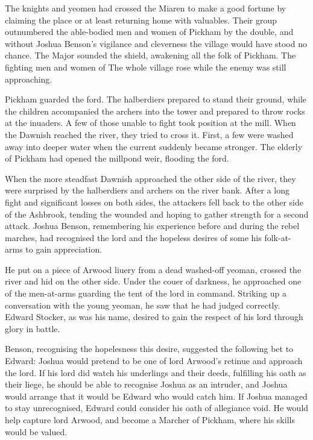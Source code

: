 \documentclass[twoside,11pt,b5paper,twocolumn]{scrbook}
\begin{document}
The knights and
yeomen had crossed the Miaren to
make a good fortune by claiming the
place or at least returning home
with valuables. Their group
outnumbered the able-bodied men
and women of Pickham by the
double, and without Joshua
Benson's vigilance and cleverness
the village would have stood no
chance. The Major sounded the shield,
awakening all the folk of Pickham.
The fighting men and women of 
The whole village rose while
the enemy was still approaching.

Pickham guarded the ford. The
halberdiers prepared to stand their 
ground, while the children
accompanied the archers into the
tower and prepared to throw rocks 
at the inuaders. A few of those
unable to fight took position at the
mill. When the Dawnish
reached the river, they tried to cross
it. First, a few were washed away 
into deeper water when the current 
suddenly became stronger. The
elderly of Pickham had opened the
millpond weir, flooding the ford.

When the more steadfast Dawnish
approached the other side of the river,
they were surprised by the
halberdiers and archers on the river
bank. After a long fight and
significant losses on both sides, the
attackers fell back to the other side of
 the Ashbrook, tending the wounded
and hoping to gather strength for a
 second attack. Joshua Benson,
remembering his experience before
and during the rebel marches, had
recognised the lord and the hopeless
desires of some his
folk-at-arms to gain
appreciation.

He
put on a piece of
Arwood liuery from a
dead washed-off
yeoman, crossed the
river and hid on the
other side. Under the
couer of darkness, he
approached one of the
men-at-arms guarding the tent of
the lord in command. Striking up a
conversation with the young
yeoman, he saw that he had judged
correctly. Edward Stocker, as was
his name, desired to gain the respect
of his lord through glory in battle.

Benson, recognising the hopelesness
this desire, suggested the following
bet to Edward: Joshua would pretend
to be one of lord Arwood’s retinue
and approach the lord. If his lord did
watch his underlings and their deeds,
fulfilling his oath as their liege, he
should be able to recognise Joshua as
an intruder, and Joshua would
arrange that it would be Edward
who would catch him. If Joshua
managed to stay unrecognised,
Edward could consider his oath of
allegiance void. He would help
capture lord Arwood, and become a
Marcher of Pickham, where his
skills would be valued.
\end{document}
